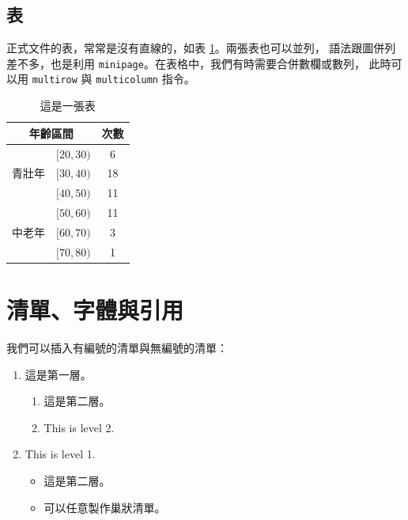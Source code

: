 \documentclass[12pt, a4paper]{article}
\begin{document}
\subsection{表}

正式文件的表，常常是沒有直線的，如表 \ref{tab:fre}。兩張表也可以並列，
語法跟圖併列差不多，也是利用 \verb|minipage|。在表格中，我們有時需要合併數欄或數列，
此時可以用 \verb|multirow| 與 \verb|multicolumn| 指令。

\begin{table}[hbt]
\centering
	\begin{tabular}{ccc}
	\toprule
	\multicolumn{2}{c}{年齡區間} & 次數 \\
	\midrule 
	\multirow{3}{*}{青壯年} & $[20, 30)$ & 6 \\
	& $[30, 40)$ & 18 \\
	& $[40, 50)$ & 11 \\
	\midrule
	\multirow{3}{*}{中老年} & $[50, 60)$ & 11 \\
	& $[60, 70)$ & 3 \\
	& $[70, 80)$ & 1 \\
	\bottomrule
	\end{tabular}
	\caption{這是一張表}
	\label{tab:fre}
\end{table}










\section{清單、字體與引用}

我們可以插入有編號的清單與無編號的清單：

\begin{enumerate}
\item 這是第一層。

	\begin{enumerate}
	\item 這是第二層。
	\item This is level 2. 
	\end{enumerate}
	
\item This is level 1. 

	\begin{itemize}
	\item 這是第二層。
	\item 可以任意製作巢狀清單。
	\end{itemize}

\end{enumerate}
\end{document}
